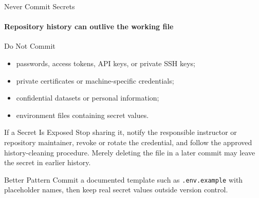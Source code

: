 \begin{frame}{Never Commit Secrets}
\framesubtitle{Repository history can outlive the working file}
\footnotesize
\begin{alertblock}{Do Not Commit}
\begin{itemize}\setlength{\itemsep}{0.20em}
\item passwords, access tokens, API keys, or private SSH keys;
\item private certificates or machine-specific credentials;
\item confidential datasets or personal information;
\item environment files containing secret values.
\end{itemize}
\end{alertblock}
\begin{block}{If a Secret Is Exposed}
Stop sharing it, notify the responsible instructor or repository maintainer, revoke or rotate the credential, and follow the approved history-cleaning procedure. Merely deleting the file in a later commit may leave the secret in earlier history.
\end{block}
\begin{exampleblock}{Better Pattern}
Commit a documented template such as \texttt{.env.example} with placeholder names, then keep real secret values outside version control.
\end{exampleblock}
\end{frame}

